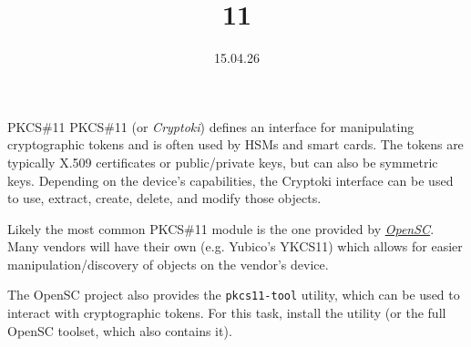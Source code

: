 \documentclass{practice}
\title{11}
\date{15.04.26}
\begin{document}
\maketitle

\begin{task}{PKCS\#11}
  PKCS\#11 (or \emph{Cryptoki}) defines an interface for manipulating cryptographic tokens and is often used by HSMs and smart cards.
  The tokens are typically X.509 certificates or public/private keys, but can also be symmetric keys.
  Depending on the device's capabilities, the Cryptoki interface can be used to use, extract, create, delete, and modify those objects.

  Likely the most common PKCS\#11 module is the one provided by \href{https://github.com/opensc/opensc}{\emph{OpenSC}}.
  Many vendors will have their own (e.g. Yubico's YKCS11) which allows for easier manipulation/discovery of objects on the vendor's device.

  The OpenSC project also provides the \texttt{pkcs11-tool} utility, which can be used to interact with cryptographic tokens.
  For this task, install the utility (or the full OpenSC toolset, which also contains it).
\end{task}
\end{document}
